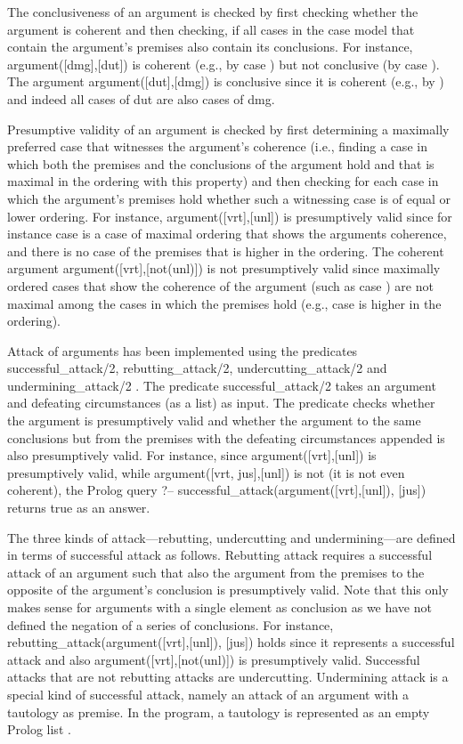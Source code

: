 \documentclass{IOS-Book-Article}
\begin{document}
The conclusiveness of an argument is checked by first checking whether the argument is coherent and then checking, if all cases in the case model that contain the argument's premises also contain its conclusions. For instance, {\mf argument([dmg],[dut])} is coherent (e.g., by case {}) but not conclusive (by case {}). The argument {\mf argument([dut],[dmg])} is conclusive since it is coherent (e.g., by {}) and indeed all cases of {\mf dut} are also cases of {\mf dmg}.

Presumptive validity of an argument is checked by first determining a maximally preferred case that witnesses the argument's coherence (i.e., finding a case in which both the premises and the conclusions of the argument hold and that is maximal in the ordering with this property) and then checking for each case in which the argument's premises hold whether such a witnessing case is of equal or lower ordering. For instance, {\mf argument([vrt],[unl])} is presumptively valid since for instance case {} is a case of maximal ordering that shows the arguments coherence, and there is no case of the premises that is higher in the ordering. The coherent argument {\mf argument([vrt],[not(unl)])} is not presumptively valid since maximally ordered cases that show the coherence of the argument (such as case {}) are not maximal among the cases in which the premises hold (e.g., case {} is higher in the ordering).

Attack of arguments has been implemented using the predicates {\mf successful\_attack/2}, {\mf rebutting\_attack/2}, {\mf undercutting\_attack/2} and {\mf undermining\_attack/2} . The predicate {\mf successful\_attack/2} takes an argument and defeating circumstances (as a list) as input. The predicate checks whether the argument is presumptively valid and whether the argument to the same conclusions but from the premises with the defeating circumstances appended is also presumptively valid. For instance, since {\mf argument([vrt],[unl])} is presumptively valid, while {\mf argument([vrt, jus],[unl])} is not (it is not even coherent), the Prolog query {\mf ?-- successful\_attack(argument([vrt],[unl]), [jus])} returns {\mf true} as an answer.

The three kinds of attack---rebutting, undercutting and undermining---are defined in terms of successful attack as follows. Rebutting attack requires a successful attack of an argument such that also the argument from the premises to the opposite of the argument's conclusion is presumptively valid. Note that this only makes sense for arguments with a single element as conclusion as we have not defined the negation of a series of conclusions. For instance, {\mf rebutting\_attack(argument([vrt],[unl]), [jus])} holds since it represents a successful attack and also argument([vrt],[not(unl)]) is presumptively valid. Successful attacks that are not rebutting attacks are undercutting. Undermining attack is a special kind of successful attack, namely an attack of an argument with a tautology as premise. In the program, a tautology is represented as an empty Prolog list {\mf [ ]}.
\end{document}

